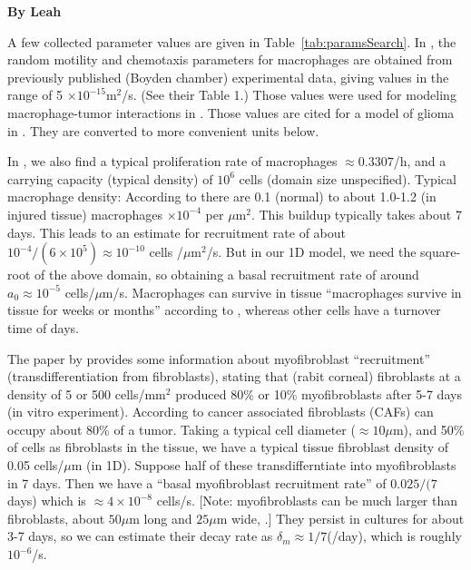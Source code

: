 \documentclass{article}
\begin{document}
\textbf{By Leah}

A few collected parameter values are given in Table~\ref{tab:paramsSearch}. In \cite{owen1997pattern}, the random motility and chemotaxis parameters for macrophages are obtained from previously published (Boyden chamber)  experimental data, giving values in the range of 5 $\times 10^{-15}$m$^2$/s. (See their Table 1.) Those values were used for modeling macrophage-tumor interactions in \cite{owen1997pattern}. Those values are cited for a model of glioma in \cite{khajanchi2021spatiotemporal}. They are converted to more convenient units below.

In \cite{khajanchi2021spatiotemporal}, we also find a typical proliferation rate of macrophages $\approx 0.3307$/h, and a carrying capacity (typical density) of  $10^6$ cells (domain size unspecified). Typical macrophage density: According to \cite{gupta2006spatiotemporal} there are 0.1 (normal) to about 1.0-1.2 (in injured tissue)  macrophages $\times 10^{-4}$ per $\mu$m$^2$. This buildup typically takes about 7 days. This leads to an estimate for recruitment rate of about $10^{-4}/(6\times 10^5) \approx 10^{-10}$ cells /$\mu$m$^2$/s. But in our 1D model, we need the square-root of the above domain, so obtaining a basal recruitment rate of around $a_0\approx 10^{-5}$ cells/$\mu$m/s.
Macrophages can survive in tissue ``macrophages survive in tissue for weeks or months'' according to \cite{owen1997pattern}, whereas other cells have a turnover time of days.


The paper by \cite{masur1996myofibroblasts} provides some information about myofibroblast ``recruitment'' (transdifferentiation from fibroblasts), stating that (rabit corneal) fibroblasts at a density of 5 or 500 cells/mm$^2$ produced 80\% or 10\% myofibroblasts after 5-7 days (in vitro experiment). According to \cite{gascard2016carcinoma} cancer associated fibroblasts (CAFs) can occupy about 80\% of a tumor. Taking a typical cell diameter ($\approx 10\mu$m), and 50\% of cells as fibroblasts in the tissue, we have a typical tissue fibroblast density of 0.05 cells/$\mu$m (in 1D). Suppose half of these transdifferntiate into myofibroblasts in 7 days. Then we have a ``basal myofibroblast recruitment rate'' of  $0.025/(7$ days) which is $\approx 4 \times 10^{-8}$ cells/s. [Note: myofibroblasts can be much larger than fibroblasts, about $50\mu$m long and $25\mu$m wide, \cite{masur1996myofibroblasts}.] They persist in cultures for about 3-7 days, so we can estimate their decay rate as $\delta_m\approx 1/7$(/day), which is roughly $10^{-6}$/s.
\end{document}
